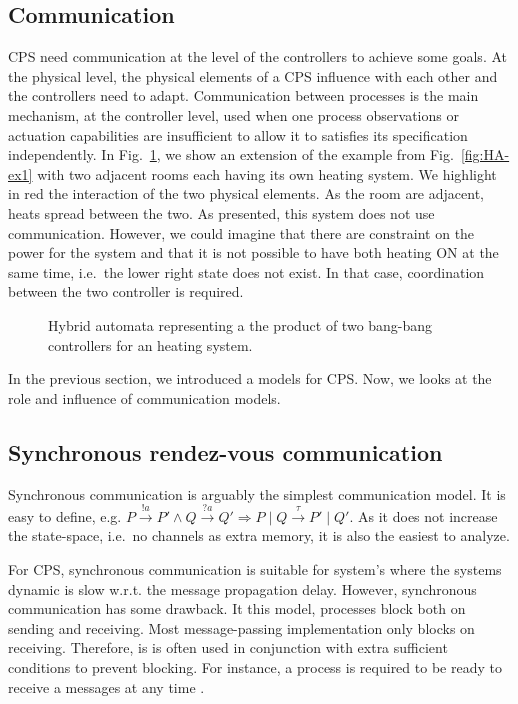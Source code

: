 \documentclass[
graybox,
envcountchap
]{svmult}
\begin{document}
\begin{bibunit}
\section{Communication} %

CPS need communication at the level of the controllers to achieve some goals.
At the physical level, the physical elements of a CPS influence with each other and the controllers need to adapt.
Communication between processes is the main mechanism, at the controller level, used when one process observations or actuation capabilities are insufficient to allow it to satisfies its specification independently.
In Fig.~\ref{fig:HA-ex2}, we show an extension of the example from Fig.~\ref{fig:HA-ex1} with two adjacent rooms each having its own heating system.
We highlight in {\color{red!90!black}red} the interaction of the two physical elements.
As the room are adjacent, heats spread between the two.
As presented, this system does not use communication.
However, we could imagine that there are constraint on the power for the system and that it is not possible to have both heating ON at the same time, i.e.~the lower right state does not exist.
In that case, coordination between the two controller is required.


\begin{figure}
\centering

\caption{
    Hybrid automata representing a the product of two bang-bang controllers for an heating system.
}
\label{fig:HA-ex2}
\end{figure}

In the previous section, we introduced a models for CPS.
Now, we looks at the role and influence of communication models.

    \subsection{Synchronous rendez-vous communication}

Synchronous communication is arguably the simplest communication model.
It is easy to define, e.g. $P \stackrel{!a}{\rightarrow} P' \land Q \stackrel{?a}{\rightarrow} Q' \Rightarrow P \mid Q \stackrel{\tau}{\rightarrow} P' \mid Q'$.
As it does not increase the state-space, i.e.~no channels as extra memory, it is also the easiest to analyze.

For CPS, synchronous communication is suitable for system's where the systems dynamic is slow w.r.t. the message propagation delay.
However, synchronous communication has some drawback.
It this model, processes block both on sending and receiving.
Most message-passing implementation only blocks on receiving.
Therefore, is is often used in conjunction with extra sufficient conditions to prevent blocking.
For instance, a process is required to be ready to receive a messages at any time \cite{?}. 



\end{bibunit}
\end{document}
